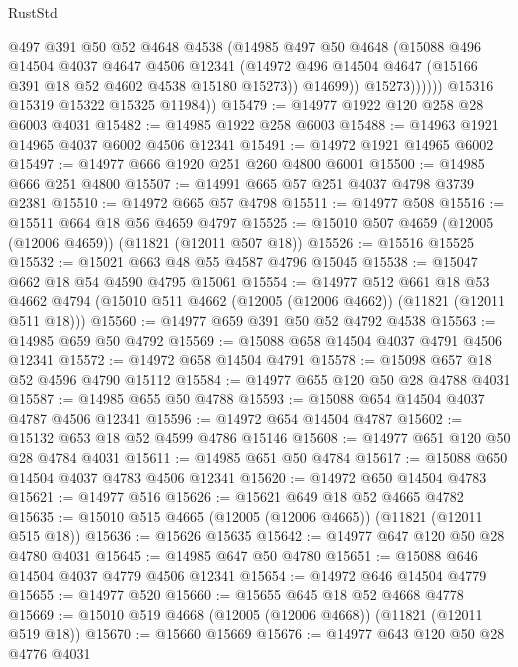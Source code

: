 \begin{lexlean}{RustStd}
\begin{coremodule}
                    @497
                    @391
                    @50
                    @52
                    @4648
                    @4538
                    (@14985
                      @497
                      @50
                      @4648
                      (@15088
                        @496
                        @14504
                        @4037
                        @4647
                        @4506
                        @12341
                        (@14972 @496 @14504 @4647 (@15166 @391 @18 @52 @4602 @4538 @15180 @15273))
                        @14699))
                    @15273))))))
        @15316
        @15319
        @15322
        @15325
        @11984))
@15479 := @14977 @1922 @120 @258 @28 @6003 @4031
@15482 := @14985 @1922 @258 @6003
@15488 := @14963 @1921 @14965 @4037 @6002 @4506 @12341
@15491 := @14972 @1921 @14965 @6002
@15497 := @14977 @666 @1920 @251 @260 @4800 @6001
@15500 := @14985 @666 @251 @4800
@15507 := @14991 @665 @57 @251 @4037 @4798 @3739 @2381
@15510 := @14972 @665 @57 @4798
@15511 := @14977 @508
@15516 := @15511 @664 @18 @56 @4659 @4797
@15525 := @15010 @507 @4659 (@12005 (@12006 @4659)) (@11821 (@12011 @507 @18))
@15526 := @15516 @15525
@15532 := @15021 @663 @48 @55 @4587 @4796 @15045
@15538 := @15047 @662 @18 @54 @4590 @4795 @15061
@15554 := @14977
    @512
    @661
    @18
    @53
    @4662
    @4794
    (@15010 @511 @4662 (@12005 (@12006 @4662)) (@11821 (@12011 @511 @18)))
@15560 := @14977 @659 @391 @50 @52 @4792 @4538
@15563 := @14985 @659 @50 @4792
@15569 := @15088 @658 @14504 @4037 @4791 @4506 @12341
@15572 := @14972 @658 @14504 @4791
@15578 := @15098 @657 @18 @52 @4596 @4790 @15112
@15584 := @14977 @655 @120 @50 @28 @4788 @4031
@15587 := @14985 @655 @50 @4788
@15593 := @15088 @654 @14504 @4037 @4787 @4506 @12341
@15596 := @14972 @654 @14504 @4787
@15602 := @15132 @653 @18 @52 @4599 @4786 @15146
@15608 := @14977 @651 @120 @50 @28 @4784 @4031
@15611 := @14985 @651 @50 @4784
@15617 := @15088 @650 @14504 @4037 @4783 @4506 @12341
@15620 := @14972 @650 @14504 @4783
@15621 := @14977 @516
@15626 := @15621 @649 @18 @52 @4665 @4782
@15635 := @15010 @515 @4665 (@12005 (@12006 @4665)) (@11821 (@12011 @515 @18))
@15636 := @15626 @15635
@15642 := @14977 @647 @120 @50 @28 @4780 @4031
@15645 := @14985 @647 @50 @4780
@15651 := @15088 @646 @14504 @4037 @4779 @4506 @12341
@15654 := @14972 @646 @14504 @4779
@15655 := @14977 @520
@15660 := @15655 @645 @18 @52 @4668 @4778
@15669 := @15010 @519 @4668 (@12005 (@12006 @4668)) (@11821 (@12011 @519 @18))
@15670 := @15660 @15669
@15676 := @14977 @643 @120 @50 @28 @4776 @4031

\end{coremodule}
\end{lexlean}
